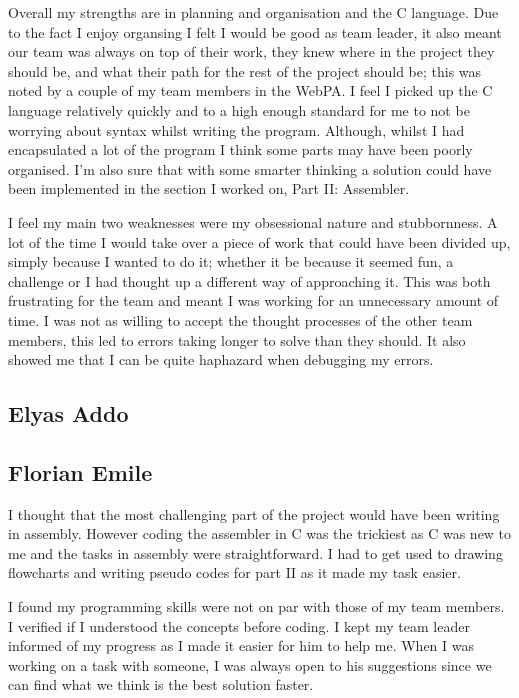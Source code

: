 \documentclass[11pt]{article}
\begin{document}
Overall my strengths are in planning and organisation and the C language. Due to the fact I enjoy organsing I felt I would be good as team leader, it also meant our team was always on top of their work, they knew where in the project they should be, and what their path for the rest of the project should be; this was noted by a couple of my team members in the WebPA. I feel I picked up the C language relatively quickly and to a high enough standard for me to not be worrying about syntax whilst writing the program. Although, whilst I had encapsulated a lot of the program I think some parts may have been poorly organised. I'm also sure that with some smarter thinking a  solution could have been implemented in the section I worked on, Part II: Assembler. \newline

I feel my main two weaknesses were my obsessional nature and stubbornness. A lot of the time I would take over a piece of work that could have been divided up, simply because I wanted to do it; whether it be because it seemed fun, a challenge or I had thought up a different way of approaching it. This was both frustrating for the team and meant I was working for an unnecessary amount of time. I was not as willing to accept the thought processes of the other team members, this led to errors taking longer to solve than they should. It also showed me that I can be quite haphazard when debugging my errors.

\subsection{Elyas Addo}
\subsection{Florian Emile}
I thought that the most challenging part of the project would have been writing
in assembly. However coding the assembler in C was the trickiest as C was new to
me and the tasks in assembly were straightforward. I had to get used to drawing
flowcharts and writing pseudo codes for part II as it made my task easier.

I found my programming skills were not on par with those of my team members. I
verified if I understood the concepts before coding. I kept my team leader
informed of my progress as I made it easier for him to help me. When I was
working on a task with someone, I was always open to his suggestions since we
can find what we think is the best solution faster.
\end{document}
